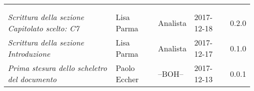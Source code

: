 \newpage 
\section*{}
\begin{table}[H]
	\centering
	\begin{tabular}{p{4cm}|C{3cm}|C{3cm}|R{2.5cm}|R{2cm}}
		
		 & & & & \\
		
		
		\emph{}	 & & & & \\
		\hline
		
		\emph{Scrittura della sezione Capitolato scelto: C7 } & Lisa Parma & Analista & 2017-12-18 & 0.2.0 \\
		\hline
		
		\emph{Scrittura della sezione Introduzione } & Lisa Parma & Analista & 2017-12-17 & 0.1.0 \\
		\hline
		
		\emph{Prima stesura dello scheletro del documento} & Paolo Eccher & --BOH-- & 2017-12-13 & 0.0.1 \\
		
	\end{tabular}
	
\end{table}


\clearpage